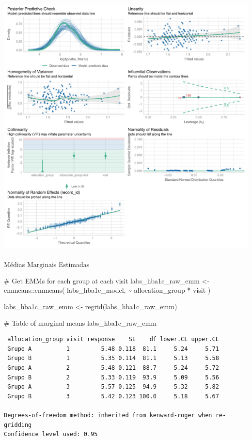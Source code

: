 \documentclass[
  letterpaper,
  DIV=11,
  numbers=noendperiod]{scrartcl}
\makeatletter
\let\oldparagraph\paragraph
\renewcommand{\paragraph}{
    \@ifstar
      \xxxParagraphStar
      \xxxParagraphNoStar
  }
\newcommand{\xxxParagraphStar}[1]{\oldparagraph*{#1}\mbox{}}
\newcommand{\xxxParagraphNoStar}[1]{\oldparagraph{#1}\mbox{}}
\newenvironment{Shaded}{\begin{snugshade}}{\end{snugshade}}
\newcommand{\CommentTok}[1]{\textcolor[rgb]{0.37,0.37,0.37}{#1}}
\newcommand{\FunctionTok}[1]{\textcolor[rgb]{0.28,0.35,0.67}{#1}}
\newcommand{\NormalTok}[1]{\textcolor[rgb]{0.00,0.23,0.31}{#1}}
\newcommand{\OtherTok}[1]{\textcolor[rgb]{0.00,0.23,0.31}{#1}}
\newcommand{\SpecialCharTok}[1]{\textcolor[rgb]{0.37,0.37,0.37}{#1}}
\makeatother
\begin{document}
\includegraphics{Outcomes_V1V2V3_files/figure-pdf/labs_hba1c_4-2.pdf}

\paragraph{Médias Marginais
Estimadas}\label{muxe9dias-marginais-estimadas-9}

\begin{Shaded}
\begin{Highlighting}[]
\CommentTok{\# Get EMMs for each group at each visit}
\NormalTok{labs\_hba1c\_raw\_emm }\OtherTok{\textless{}{-}}\NormalTok{ emmeans}\SpecialCharTok{::}\FunctionTok{emmeans}\NormalTok{(}
\NormalTok{    labs\_hba1c\_model, }
    \SpecialCharTok{\textasciitilde{}}\NormalTok{ allocation\_group }\SpecialCharTok{*}\NormalTok{ visit}
\NormalTok{)}

\NormalTok{labs\_hba1c\_raw\_emm }\OtherTok{\textless{}{-}} \FunctionTok{regrid}\NormalTok{(labs\_hba1c\_raw\_emm)}

\CommentTok{\# Table of marginal means}
\NormalTok{labs\_hba1c\_raw\_emm}
\end{Highlighting}
\end{Shaded}

\begin{verbatim}
 allocation_group visit response    SE    df lower.CL upper.CL
 Grupo A          1         5.48 0.118  81.1     5.24     5.71
 Grupo B          1         5.35 0.114  81.1     5.13     5.58
 Grupo A          2         5.48 0.121  88.7     5.24     5.72
 Grupo B          2         5.33 0.119  93.9     5.09     5.56
 Grupo A          3         5.57 0.125  94.9     5.32     5.82
 Grupo B          3         5.42 0.123 100.0     5.18     5.67

Degrees-of-freedom method: inherited from kenward-roger when re-gridding 
Confidence level used: 0.95 
\end{verbatim}
\end{document}

